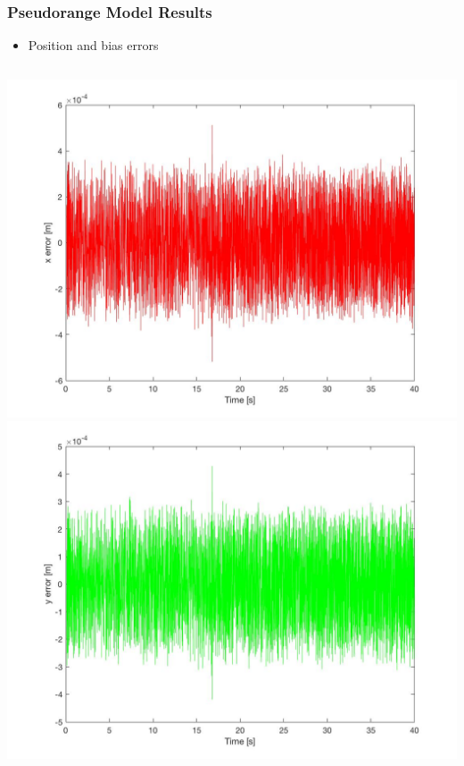 \documentclass{beamer}
\begin{document}
	\begin{frame}
		\frametitle{Pseudorange Model Results}
		\begin{itemize}
		       \item Position and bias errors
		\end{itemize}
		\begin{columns}
			\includegraphics[scale= 0.1]{x_error.jpg}\\
			\includegraphics[scale=0.1]{y_error.jpg}

\end{columns}
\end{frame}
\end{document}
